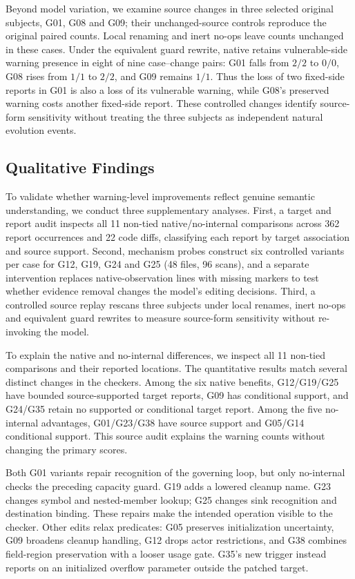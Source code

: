 Beyond model variation, we examine source changes in three selected original subjects, G01, G08 and G09; their unchanged-source controls reproduce the original paired counts.
Local renaming and inert no-ops leave counts unchanged in these cases.
Under the equivalent guard rewrite, native retains vulnerable-side warning presence in eight of nine case--change pairs: G01 falls from $2/2$ to $0/0$, G08 rises from $1/1$ to $2/2$, and G09 remains $1/1$.
Thus the loss of two fixed-side reports in G01 is also a loss of its vulnerable warning, while G08's preserved warning costs another fixed-side report.
These controlled changes identify source-form sensitivity without treating the three subjects as independent natural evolution events.

\subsection{Qualitative Findings}
\label{sec:target-results}

To validate whether warning-level improvements reflect genuine semantic understanding, we conduct three supplementary analyses.
First, a target and report audit inspects all 11 non-tied native/no-internal comparisons across 362 report occurrences and 22 code diffs, classifying each report by target association and source support.
Second, mechanism probes construct six controlled variants per case for G12, G19, G24 and G25 (48 files, 96 scans), and a separate intervention replaces native-observation lines with missing markers to test whether evidence removal changes the model's editing decisions.
Third, a controlled source replay rescans three subjects under local renames, inert no-ops and equivalent guard rewrites to measure source-form sensitivity without re-invoking the model.

To explain the native and no-internal differences, we inspect all 11 non-tied comparisons and their reported locations.
The quantitative results match several distinct changes in the checkers.
Among the six native benefits, G12/G19/G25 have bounded source-supported target reports, G09 has conditional support, and G24/G35 retain no supported or conditional target report.
Among the five no-internal advantages, G01/G23/G38 have source support and G05/G14 conditional support.
This source audit explains the warning counts without changing the primary scores.

Both G01 variants repair recognition of the governing loop, but only no-internal checks the preceding capacity guard.
G19 adds a lowered cleanup name.
G23 changes symbol and nested-member lookup; G25 changes sink recognition and destination binding.
These repairs make the intended operation visible to the checker.
Other edits relax predicates: G05 preserves initialization uncertainty, G09 broadens cleanup handling, G12 drops actor restrictions, and G38 combines field-region preservation with a looser usage gate.
G35's new trigger instead reports on an initialized overflow parameter outside the patched target.

